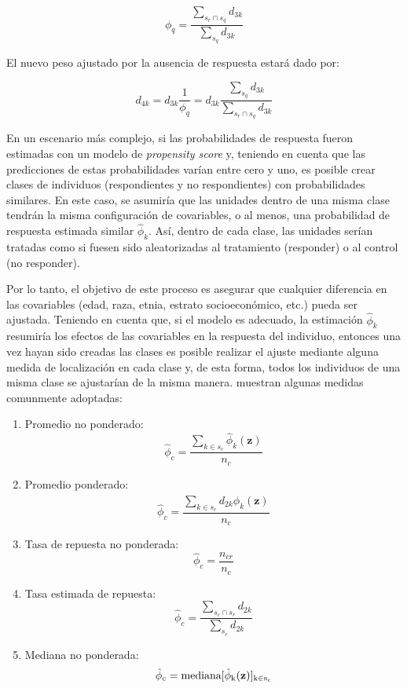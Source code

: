 \documentclass[
  10pt,
  spanish,
]{book}
\providecommand{\tightlist}{%
  \setlength{\itemsep}{0pt}\setlength{\parskip}{0pt}}
\begin{document}
\[
\phi_{q} = \frac{\sum_{s_{r}\cap s_q}d_{3k}}{\sum_{s_{q}}d_{3k}}
\]

El nuevo peso ajustado por la ausencia de respuesta estará dado por:

\[
d_{4k} = d_{3k}\frac{1}{\phi_{q}} 
= d_{3k}\frac{\sum_{s_q}d_{3k}}{\sum_{s_{r}\cap s_q}d_{3k}}
\]

En un escenario más complejo, si las probabilidades de respuesta fueron estimadas con un modelo de \emph{propensity score} y, teniendo en cuenta que las predicciones de estas probabilidades varían entre cero y uno, es posible crear clases de individuos (respondientes y no respondientes) con probabilidades similares. En este caso, se asumiría que las unidades dentro de una misma clase tendrán la misma configuración de covariables, o al menos, una probabilidad de respuesta estimada similar \(\hat\phi_k\). Así, dentro de cada clase, las unidades serían tratadas como si fuesen sido aleatorizadas al tratamiento (responder) o al control (no responder).

Por lo tanto, el objetivo de este proceso es asegurar que cualquier diferencia en las covariables (edad, raza, etnia, estrato socioeconómico, etc.) pueda ser ajustada. Teniendo en cuenta que, si el modelo es adecuado, la estimación \(\hat\phi_k\) resumiría los efectos de las covariables en la respuesta del individuo, entonces una vez hayan sido creadas las clases es posible realizar el ajuste mediante alguna medida de localización en cada clase y, de esta forma, todos los individuos de una misma clase se ajustarían de la misma manera. \citet{Valliant_Dever_2017} muestran algunas medidas comunmente adoptadas:

\begin{enumerate}
\def\labelenumi{\arabic{enumi}.}
\tightlist
\item
  Promedio no ponderado:
  \[\hat{\phi}_c = \frac{\sum_{k \in s_c}\hat{\phi}_k(\mathbf{z})}{n_c}\]
\item
  Promedio ponderado:
  \[\hat{\phi}_c = \frac{\sum_{k \in s_c}d_{2k}\hat{\phi}_k(\mathbf{z})}{n_c}\]
\item
  Tasa de repuesta no ponderada:
  \[\hat{\phi}_c = \frac{n_{cr}}{n_c}\]
\item
  Tasa estimada de repuesta:
  \[\hat{\phi}_c = \frac{\sum_{s_c \cap s_r}d_{2k}}{\sum_{s_c}d_{2k}}\]
\item
  Mediana no ponderada:
  \[\hat{\phi}_c = \rm mediana[\hat{\phi}_k(\mathbf{z})]_{k \in s_c}\]
\end{enumerate}
\end{document}
